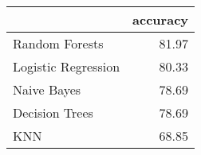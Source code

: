 \begin{tabular}{lr}
\toprule
{} &  accuracy \\
\midrule
Random Forests      &     81.97 \\
Logistic Regression &     80.33 \\
Naive Bayes         &     78.69 \\
Decision Trees      &     78.69 \\
KNN                 &     68.85 \\
\bottomrule
\end{tabular}

